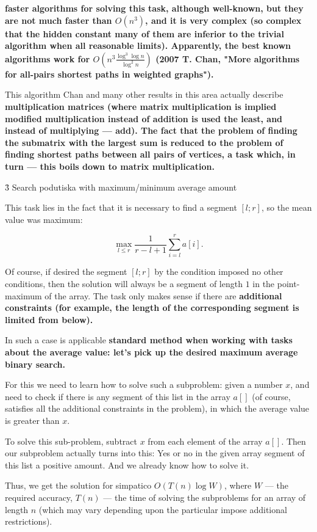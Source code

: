 \bf{faster} algorithms for solving this task, although well-known, but they are not much faster than $O(n^3)$, and it is very complex (so complex that the hidden constant many of them are inferior to the trivial algorithm when all reasonable limits). Apparently, the best known algorithms work for $O \left( n^3 \frac{ \log^3 \log n }{ \log^2 n} \right)$ (2007 T. Chan, "More algorithms for all-pairs shortest paths in weighted graphs").

This algorithm Chan and many other results in this area actually describe \bf{multiplication} matrices (where matrix multiplication is implied modified multiplication instead of addition is used the least, and instead of multiplying --- add). The fact that the problem of finding the submatrix with the largest sum is reduced to the problem of finding shortest paths between all pairs of vertices, a task which, in turn --- this boils down to matrix multiplication.

\h3{ Search podutiska with maximum/minimum average amount }

This task lies in the fact that it is necessary to find a segment $[l;r]$, so the mean value was maximum:

$$ \max_{l \le r} \frac{ 1 }{ r-l+1 } \sum_{i=l}^{r} a[i]. $$

Of course, if desired the segment $[l;r]$ by the condition imposed no other conditions, then the solution will always be a segment of length $1$ in the point-maximum of the array. The task only makes sense if there are \bf{additional constraints} (for example, the length of the corresponding segment is limited from below).

In such a case is applicable \bf{standard method} when working with tasks about the average value: let's pick up the desired maximum average \bf{binary search}.

For this we need to learn how to solve such a subproblem: given a number $x$, and need to check if there is any segment of this list in the array $a[]$ (of course, satisfies all the additional constraints in the problem), in which the average value is greater than $x$.

To solve this sub-problem, subtract $x$ from each element of the array $a[]$. Then our subproblem actually turns into this: Yes or no in the given array segment of this list a positive amount. And we already know how to solve it.

Thus, we get the solution for simpatico $O (T(n) \log W)$, where $W$ --- the required accuracy, $T(n)$ --- the time of solving the subproblems for an array of length $n$ (which may vary depending upon the particular impose additional restrictions).

